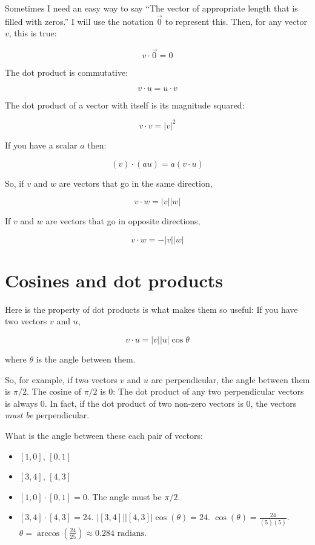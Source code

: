 Sometimes I need an easy way to say ``The vector of appropriate length that is filled with zeros.''
I will use the notation $\vec{0}$ to represent this. Then, for any vector $v$, this is true:

$$v \cdot \vec{0} = 0$$

The dot product is commutative:

$$v \cdot u = u \cdot v$$

The dot product of a vector with itself is its magnitude squared:

$$ v \cdot v = |v|^2 $$

If you have a scalar $a$ then:

    $$(v) \cdot (a u) = a (v \cdot u)$$

So, if $v$ and $w$ are vectors that go in the same direction,

    $$v \cdot w = |v| |w|$$

If $v$ and $w$ are vectors that go in opposite directions,

    $$v \cdot w = -|v| |w|$$

\section{Cosines and dot products}

Here is the property of dot products is what makes them so useful: 
If you have two vectors $v$ and $u$,

$$v \cdot u = |v| |u| \cos \theta$$

where $\theta$ is the angle between them.

So, for example, if two vectors $v$ and $u$ are perpendicular, the angle between them is $\pi/2$.  
The cosine of $\pi/2$ is 0: The dot product of any two perpendicular vectors is always 0. In fact, if 
the dot product of two non-zero vectors is 0, the vectors \textit{must be} perpendicular.

\begin{Exercise}[title={Using dot products}, label=cos_dot_products]
    What is the angle between these each pair of vectors:
    \begin{itemize}
        \item $[1, 0]$, $[0, 1]$
        \item $[3,4]$, $[4,3]$
    \end{itemize}
\end{Exercise}
\begin{Answer}[ref=cos_dot_products]
        \begin{itemize}
            \item $[1,0] \cdot [0,1] = 0$.  The angle must be $\pi/2$.
            \item $[3,4] \cdot [4, 3] = 24$. $|[3,4]| |[4,3]| \cos(\theta) = 24$. 
            $\cos(\theta) = \frac{24}{(5)(5)}$. $\theta = \arccos(\frac{24}{25}) \approx 0.284 \text{ radians}$.
        \end{itemize}
\end{Answer}

